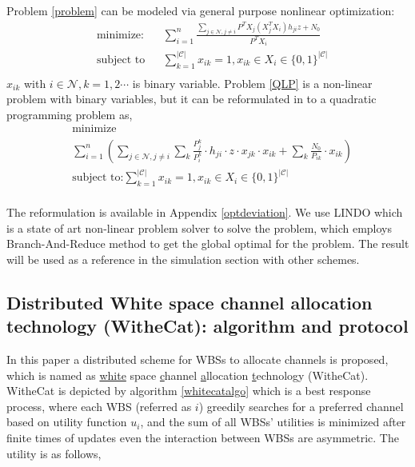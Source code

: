 Problem \ref{problem} can be modeled via general purpose nonlinear optimization:
	\begin{equation}
\label{QLP}
		\begin{aligned}
		& \underset{}{\text{minimize:}}
		& & \sum\limits^{n}_{i=1} \frac{\sum\limits_{j\in\mathcal{N}, j\neq i}P^TX_j(X_j^TX_i)h_{ji}z + N_0}{P^TX_i}\\
		& \text{subject to}
		& & \sum\limits_{k=1}^{|\mathcal{C}|}x_{ik}=1, x_{ik}\in X_i\in \{0,1\}^{|\mathcal{C}|}\\
		\end{aligned}
	\end{equation}
$x_{ik}$ with $i\in \mathcal{N}, k=1,2\cdots$ is binary variable. Problem \ref{QLP} is a non-linear problem with binary variables, but it can be reformulated in to a quadratic programming problem as,
	\begin{equation}
\label{QLP_2}
			\begin{aligned}
			& \underset{}{\text{minimize}}\\
			&\sum\limits^{n}_{i=1}(\sum\limits_{j\in\mathcal{N}, j\neq i}\sum\limits_k \frac{P_{j}^k}{P_{i}^k}\cdot h_{ji}\cdot z\cdot x_{jk}\cdot x_{ik} + \sum\limits_k \frac{N_0}{P_{ik}}\cdot x_{ik})\\
			& \text{subject to:} 
			\sum\limits_{k=1}^{|\mathcal{C}|}x_{ik}=1, x_{ik}\in X_i\in \{0,1\}^{|\mathcal{C}|}\\
			\end{aligned}
		\end{equation}

The reformulation is available in Appendix \ref{optdeviation}. We use LINDO\cite{lindo} which is a state of art non-linear problem solver to solve the problem, which employs Branch-And-Reduce method to get the global optimal for the problem. %
The result will be used as a reference in the simulation section with other schemes. 



\subsection{Distributed White space channel allocation technology (WitheCat): algorithm and protocol}
\label{whitecat}
In this paper a distributed scheme for WBSs to allocate channels is proposed,  which is named as \underline{white} space \underline{c}hannel \underline{a}llocation \underline{t}echnology (WitheCat). WitheCat is depicted by algorithm \ref{whitecatalgo} which is a best response process, where each WBS (referred as $i$) greedily searches for a preferred channel based on utility function $u_i$, and the sum of all WBSs' utilities is minimized after finite times of updates even the interaction between WBSs are asymmetric. The utility is as follows,

